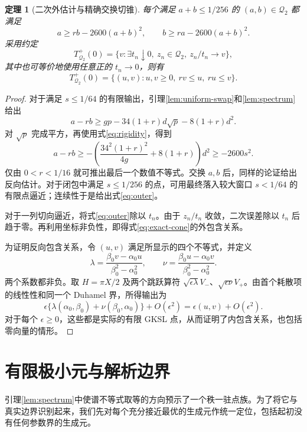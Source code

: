 \documentclass[UTF8,11pt,a4paper,fontset=fandol]{ctexart}
\newtheorem{theorem}{定理}[section]
\theoremstyle{definition}
\theoremstyle{remark}
\newcommand{\Q}{\mathcal Q_2}
\begin{document}
\begin{theorem}[二次外估计与精确交换切锥]\label{thm:swap-cone}
每个满足 \(a+b\leq1/256\) 的 \((a,b)\in\Q\) 都满足
\begin{equation}\label{eq:outer}
 a\geq rb-2600(a+b)^2,\qquad
 b\geq ra-2600(a+b)^2.
\end{equation}
采用约定
\[
 T^+_{\Q}(0)=\{v:\exists t_n\downarrow0,\ z_n\in\Q,
 \ z_n/t_n\longrightarrow v\},
\]
其中也可等价地使用任意正的 \(t_n\to0\)，则有
\begin{equation}\label{eq:exact-cone}
 T^+_{\Q}(0)=\{(u,v):u,v\geq0,\ rv\leq u,\ ru\leq v\}.
\end{equation}
\end{theorem}
\begin{proof}
对于满足 \(s\leq1/64\) 的有限输出，引理\ref{lem:uniform-swap}和\ref{lem:spectrum}给出
\[
 a-rb\geq gp-34(1+r)d\sqrt p-8(1+r)d^2.
\]
对 \(\sqrt p\) 完成平方，再使用式\eqref{eq:rigidity}，得到
\[
 a-rb\geq-\left(\frac{34^2(1+r)^2}{4g}+8(1+r)\right)d^2
 \geq-2600s^2.
\]
仅由 \(0<r<1/16\) 就可推出最后一个数值不等式。交换 \(a,b\) 后，同样的论证给出反向估计。对于闭包中满足 \(s\leq1/256\) 的点，可用最终落入较大窗口 \(s<1/64\) 的有限点逼近；连续性于是给出式\eqref{eq:outer}。

对于一列切向逼近，将式\eqref{eq:outer}除以 \(t_n\)。由于 \(z_n/t_n\) 收敛，二次误差除以 \(t_n\) 后趋于零。再利用坐标非负性，即得式\eqref{eq:exact-cone}的外包含关系。

为证明反向包含关系，令 \((u,v)\) 满足所显示的四个不等式，并定义
\[
 \lambda=\frac{\beta_0v-\alpha_0u}{\beta_0^2-\alpha_0^2},\qquad
 \nu=\frac{\beta_0u-\alpha_0v}{\beta_0^2-\alpha_0^2}.
\]
两个系数都非负。取 \(H=\pi X/2\) 及两个跳跃算符
\(\sqrt{\epsilon\lambda}V_-\)、\(\sqrt{\epsilon\nu}V_+\)。由首个耗散项的线性性和同一个 Duhamel 界，所得输出为
\[
 \epsilon\{\lambda(\alpha_0,\beta_0)+\nu(\beta_0,\alpha_0)\}+O(\epsilon^2)
 =\epsilon(u,v)+O(\epsilon^2).
\]
对于每个 \(\epsilon\geq0\)，这些都是实际的有限 GKSL 点，从而证明了内包含关系，也包括零向量的情形。
\end{proof}


\section{有限极小元与解析边界}\label{sec:analytic}

引理\ref{lem:spectrum}中使谱不等式取等的方向预示了一个秩一驻点族。为了将它与真实边界识别起来，我们先对每个充分接近最优的生成元作统一定位，包括起初没有任何参数界的生成元。
\end{document}
